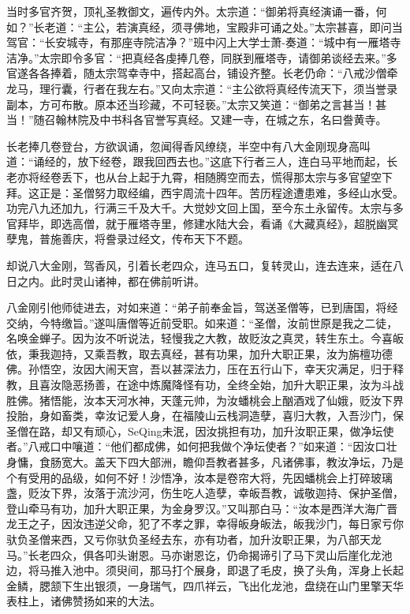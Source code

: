 \documentclass[12pt,UTF8]{ctexbook}
\begin{document}
{	当时多官齐贺，顶礼圣教御文，遍传内外。太宗道：“御弟将真经演诵一番，何如？”长老道：“主公，若演真经，须寻佛地，宝殿非可诵之处。”太宗甚喜，即问当驾官：“长安城寺，有那座寺院洁净？”班中闪上大学士萧-奏道：“城中有一雁塔寺洁净。”太宗即令多官：“把真经各虔捧几卷，同朕到雁塔寺，请御弟谈经去来。”多官遂各各捧着，随太宗驾幸寺中，搭起高台，铺设齐整。长老仍命：“八戒沙僧牵龙马，理行囊，行者在我左右。”又向太宗道：“主公欲将真经传流天下，须当誉录副本，方可布散。原本还当珍藏，不可轻亵。”太宗又笑道：“御弟之言甚当！甚当！”随召翰林院及中书科各官誉写真经。又建一寺，在城之东，名曰誊黄寺。
	
	长老捧几卷登台，方欲讽诵，忽闻得香风缭绕，半空中有八大金刚现身高叫道：“诵经的，放下经卷，跟我回西去也。”这底下行者三人，连白马平地而起，长老亦将经卷丢下，也从台上起于九霄，相随腾空而去，慌得那太宗与多官望空下拜。这正是：圣僧努力取经编，西宇周流十四年。苦历程途遭患难，多经山水受。功完八九还加九，行满三千及大千。大觉妙文回上国，至今东土永留传。太宗与多官拜毕，即选高僧，就于雁塔寺里，修建水陆大会，看诵《大藏真经》，超脱幽冥孽鬼，普施善庆，将誊录过经文，传布天下不题。
	
	却说八大金刚，驾香风，引着长老四众，连马五口，复转灵山，连去连来，适在八日之内。此时灵山诸神，都在佛前听讲。
	
	八金刚引他师徒进去，对如来道：“弟子前奉金旨，驾送圣僧等，已到唐国，将经交纳，今特缴旨。”遂叫唐僧等近前受职。如来道：“圣僧，汝前世原是我之二徒，名唤金蝉子。因为汝不听说法，轻慢我之大教，故贬汝之真灵，转生东土。今喜皈依，秉我迦持，又乘吾教，取去真经，甚有功果，加升大职正果，汝为旃檀功德佛。孙悟空，汝因大闹天宫，吾以甚深法力，压在五行山下，幸天灾满足，归于释教，且喜汝隐恶扬善，在途中炼魔降怪有功，全终全始，加升大职正果，汝为斗战胜佛。猪悟能，汝本天河水神，天蓬元帅，为汝蟠桃会上酗酒戏了仙娥，贬汝下界投胎，身如畜类，幸汝记爱人身，在福陵山云栈洞造孽，喜归大教，入吾沙门，保圣僧在路，却又有顽心，SeQing未泯，因汝挑担有功，加升汝职正果，做净坛使者。”八戒口中嚷道：“他们都成佛，如何把我做个净坛使者？”如来道：“因汝口壮身慵，食肠宽大。盖天下四大部洲，瞻仰吾教者甚多，凡诸佛事，教汝净坛，乃是个有受用的品级，如何不好！沙悟净，汝本是卷帘大将，先因蟠桃会上打碎玻璃盏，贬汝下界，汝落于流沙河，伤生吃人造孽，幸皈吾教，诚敬迦持、保护圣僧，登山牵马有功，加升大职正果，为金身罗汉。”又叫那白马：“汝本是西洋大海广晋龙王之子，因汝违逆父命，犯了不孝之罪，幸得皈身皈法，皈我沙门，每日家亏你驮负圣僧来西，又亏你驮负圣经去东，亦有功者，加升汝职正果，为八部天龙马。”长老四众，俱各叩头谢恩。马亦谢恩讫，仍命揭谛引了马下灵山后崖化龙池边，将马推入池中。须臾间，那马打个展身，即退了毛皮，换了头角，浑身上长起金鳞，腮颔下生出银须，一身瑞气，四爪祥云，飞出化龙池，盘绕在山门里擎天华表柱上，诸佛赞扬如来的大法。
	
}
\end{document}
